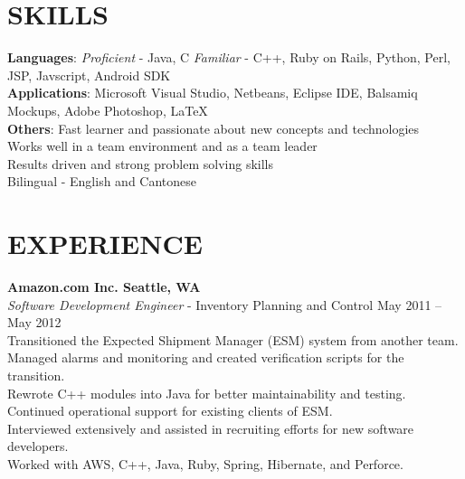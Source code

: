 \documentclass[margin,line]{resume}
\begin{document}
\begin{resume}
    \section{\mysidestyle \textbf{\large{S}\small{KILLS}}}

		\textbf{Languages}: \textsl{Proficient} - Java, C	\textsl{Familiar} - C++, Ruby on Rails, Python, Perl, JSP, Javscript, Android SDK\\
		\textbf{Applications}: Microsoft Visual Studio, Netbeans, Eclipse IDE, Balsamiq Mockups, Adobe Photoshop, \LaTeX\\
		\textbf{Others}: Fast learner and passionate about new concepts and technologies\\
			\hspace*{\identsize} Works well in a team environment and as a team leader\\
			\hspace*{\identsize} Results driven and strong problem solving skills\\
			\hspace*{\identsize} Bilingual - English and Cantonese

\sectionline

    \section{\mysidestyle \textbf{\large{E}\small{XPERIENCE}}}

    \textbf{\listing Amazon.com Inc. \hfill Seattle, WA}\\
    \textsl{Software Development Engineer} - Inventory Planning and Control \hfill May 2011 -- May 2012\\
    	\hspace*{\identsize} Transitioned the Expected Shipment Manager (ESM) system from another team.\\
			\hspace*{\identsize} Managed alarms and monitoring and created verification scripts for the transition.\\
			\hspace*{\identsize} Rewrote C++ modules into Java for better maintainability and testing.\\
			\hspace*{\identsize} Continued operational support for existing clients of ESM.\\
			\hspace*{\identsize} Interviewed extensively and assisted in recruiting efforts for new software developers.\\
			\hspace*{\identsize} Worked with AWS, C++, Java, Ruby, Spring, Hibernate, and Perforce.
		\vspace{-2mm}


\end{resume}
\end{document}
